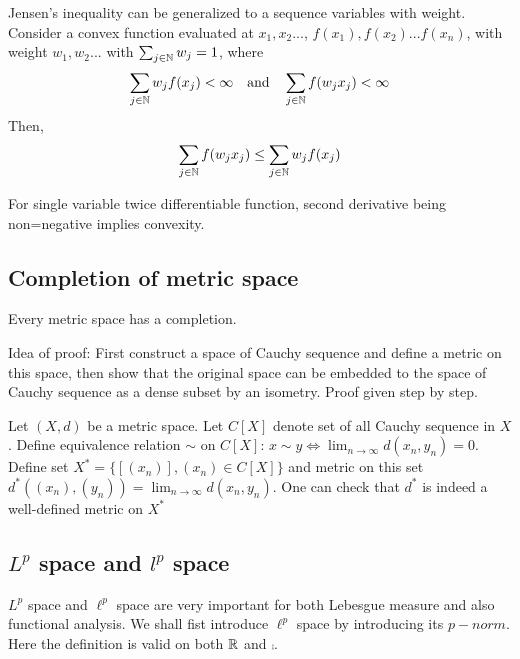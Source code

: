 \begin{remark}\rm\nextline
	Jensen's inequality can be generalized to a sequence variables with weight. Consider a convex function evaluated at $x_1,x_2...$, $f(x_1),f(x_2)...f(x_n)$, with weight $w_1,w_2...$ with $\sum_{j\in\mathbb{N}}w_j=1$, where
	$$
		\sum_{j\in\mathbb{N}}w_j f(x_j)<\infty \quad\text{and}\quad
		\sum_{j\in\mathbb{N}} f(w_jx_j)<\infty
	$$
	Then,
	$$
		\sum_{j\in\mathbb{N}} f(w_jx_j)\leq\sum_{j\in\mathbb{N}}w_j f(x_j)
	$$
\end{remark}

\begin{remark}[$f''>0$]\rm\nextline
	For single variable twice differentiable function, second derivative being non=negative implies convexity.
\end{remark}


\subsection{Completion of metric space}\label{completion of metric space}


\begin{theorem}\rm\nextline
	Every metric space has a completion.

\end{theorem}
Idea of proof: First construct a space of Cauchy sequence and define a metric on this space, then show that the original space can be embedded to the space of Cauchy sequence as a dense subset by an isometry. Proof given step by step.\\
\begin{lemma}\rm\nextline
	Let $(X,d)$ be a metric space. Let $C[X]$ denote set of all Cauchy sequence in $X$. Define equivalence relation $\sim$ on $C[X]$:
	$x\sim y\iff \lim_{n\to\infty}d(x_n,y_n)=0$. Define set $X^*=\{[(x_n)],(x_n)\in C[X]\}$ and metric on this set $d^*((x_n),(y_n))=\lim_{n\to\infty}d(x_n,y_n)$. One can check that $d^*$ is indeed a well-defined metric on $X^*$
\end{lemma}


\subsection{\texorpdfstring{$L^p$}. space and \texorpdfstring{${l}^p$}. space}
$L^p$ space and $\ell^p$ space are very important for both Lebesgue measure and also functional analysis. We shall fist introduce $\ell^p$ space by introducing its $p-norm$. Here the definition is valid on both $\mathbb{R}$ and $\comp$.

